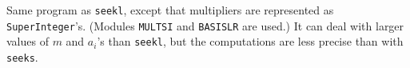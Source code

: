 
Same program as {\tt seekl}, except that multipliers
are represented as {\tt SuperInteger}'s.
(Modules {\tt MULTSI} and {\tt BASISLR} are used.)
It can deal with larger values of $m$ and $a_i$'s than {\tt seekl},
but the computations are less precise than with {\tt seeks}.
